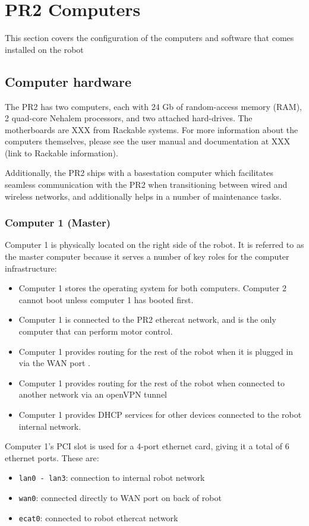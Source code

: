 \chapter{PR2 Computers}
This section covers the configuration of the computers and software that comes installed on the robot
\section{Computer hardware}
The PR2 has two computers, each with 24 Gb of random-access memory (RAM), 2
quad-core Nehalem processors, and two attached hard-drives.  The
motherboards are XXX from Rackable systems.  For more information
about the computers themselves, please see the user manual and
documentation at XXX (link to Rackable information).

Additionally, the PR2 ships with a basestation computer which
facilitates seamless communication with the PR2 when transitioning
between wired and wireless networks, and additionally helps in
a number of maintenance tasks.
\subsection{Computer 1 (Master)}
Computer 1 is physically located on the right side of the
robot. It is referred to as the master computer because it serves a
number of key roles for the computer infrastructure:
\begin{itemize}
\item Computer 1 stores the operating system for both computers. 
  Computer 2 cannot boot unless computer 1 has booted first.
\item Computer 1 is connected to the PR2 ethercat network, and is the
  only computer that can perform motor control.
\item Computer 1 provides routing for the rest of the robot when it is plugged
  in via the WAN port .
\item Computer 1 provides routing for the rest of the robot when connected to
  another network via an openVPN tunnel
\item Computer 1 provides DHCP services for other devices connected to the
  robot internal network.
\end{itemize}

Computer 1's PCI slot is used for a 4-port ethernet card, giving it a
total of 6 ethernet ports. These are:
\begin{itemize}
\item \texttt{lan0 - lan3}: connection to internal robot network 
\item \texttt{wan0}: connected directly to WAN port on back of robot 
\item \texttt{ecat0}: connected to robot ethercat network 
\end{itemize}

